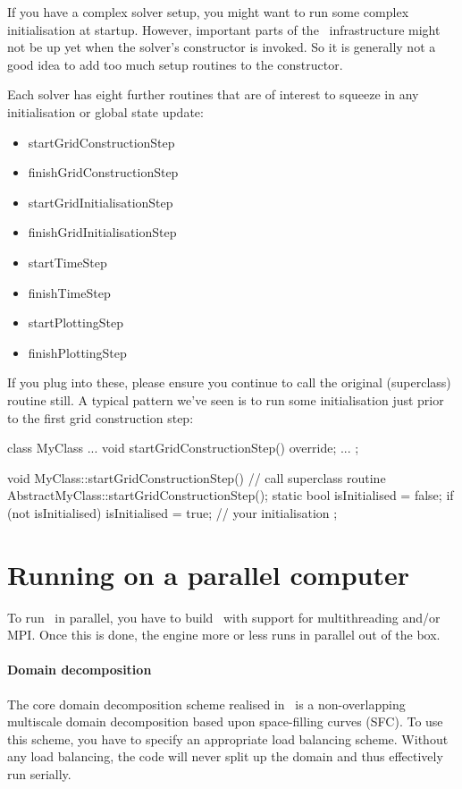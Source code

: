 If you have a complex solver setup, you might want to run some complex
initialisation at startup.
However, important parts of the \ExaHyPE\ infrastructure might not be up yet
when the solver's constructor is invoked.
So it is generally not a good idea to add too much setup routines to the
constructor.


Each solver has eight further routines that are of interest to squeeze in any
initialisation or global state update:

\begin{itemize}
  \item startGridConstructionStep
  \item finishGridConstructionStep
  \item startGridInitialisationStep
  \item finishGridInitialisationStep
  \item startTimeStep
  \item finishTimeStep
  \item startPlottingStep
  \item finishPlottingStep   
\end{itemize}


\noindent
If you plug into these, please ensure you continue to call the original
(superclass) routine still.
A typical pattern we've seen is to run some initialisation just prior to the
first grid construction step:

\begin{code}
class MyClass ... {
  void startGridConstructionStep() override;
  ...
};
\end{code}



\begin{code}
void MyClass::startGridConstructionStep() {
  // call superclass routine
  AbstractMyClass::startGridConstructionStep();
  static bool isInitialised = false;
  if (not isInitialised) {
    isInitialised = true;
    // your initialisation
  }
};
\end{code}

\section{Running on a parallel computer}

To run \ExaHyPE\ in parallel, you have to build \Peano\ with support for
multithreading and/or MPI.
Once this is done, the engine more or less runs in parallel out of the box.


\paragraph{Domain decomposition}
The core domain decomposition scheme realised in \ExaHyPE\ is a non-overlapping
multiscale domain decomposition based upon space-filling curves (SFC).
To use this scheme, you have to specify an appropriate load balancing scheme.
Without any load balancing, the code will never split up the domain and thus
effectively run serially.

